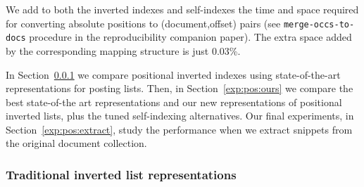 \documentclass[review]{elsarticle}
\begin{document}
We add to both 
the inverted indexes and self-indexes the time and space required for 
converting absolute positions to (document,offset) pairs (see {\tt merge-occs-to-docs} procedure in the
reproducibility companion paper). 
The extra space added by the corresponding mapping structure is just 0.03\%.

In Section~\ref{exp:pos:others} we compare positional inverted indexes using 
state-of-the-art representations for posting lists. 
Then, in Section~\ref{exp:pos:ours} we compare the best
state-of-the art representations and our new representations of positional
inverted lists, plus the tuned self-indexing alternatives.
%
Our final experiments, in Section~\ref{exp:pos:extract}, study the performance when we
extract snippets from the original document collection.
\subsubsection{Traditional inverted list representations} \label{exp:pos:others}
\end{document}

